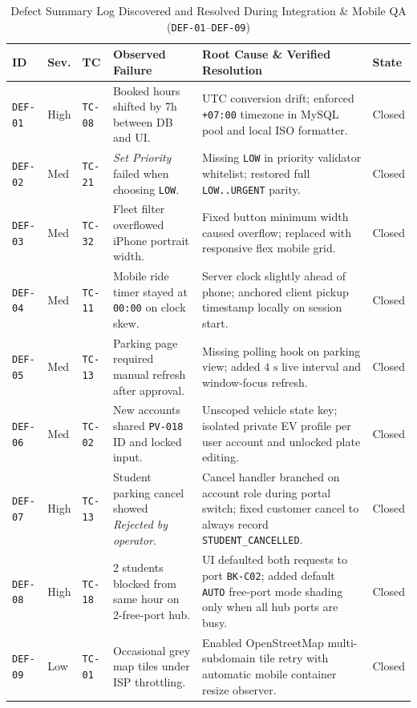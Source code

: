 \begin{table}[H]
  \centering
  \singlespacing\scriptsize
  \caption{Defect Summary Log Discovered and Resolved During Integration \& Mobile QA (\texttt{DEF-01}--\texttt{DEF-09})}
  \label{tab:defects}
  \renewcommand{\arraystretch}{1.20}
  \begin{tabularx}{\textwidth}{|C{1.40cm}|C{1.05cm}|C{1.25cm}|L{3.95cm}|Y|C{1.10cm}|}
    \hline
    \textbf{ID} & \textbf{Sev.} & \textbf{TC} & \textbf{Observed Failure} & \textbf{Root Cause \& Verified Resolution} & \textbf{State} \\
    \hline
    \texttt{DEF-01} & High & \texttt{TC-08} & Booked hours shifted by 7h between DB and UI. & UTC conversion drift; enforced \texttt{+07:00} timezone in MySQL pool and local ISO formatter. & Closed \\
    \hline
    \texttt{DEF-02} & Med & \texttt{TC-21} & \textit{Set Priority} failed when choosing \texttt{LOW}. & Missing \texttt{LOW} in priority validator whitelist; restored full \texttt{LOW..URGENT} parity. & Closed \\
    \hline
    \texttt{DEF-03} & Med & \texttt{TC-32} & Fleet filter overflowed iPhone portrait width. & Fixed button minimum width caused overflow; replaced with responsive flex mobile grid. & Closed \\
    \hline
    \texttt{DEF-04} & Med & \texttt{TC-11} & Mobile ride timer stayed at \texttt{00:00} on clock skew. & Server clock slightly ahead of phone; anchored client pickup timestamp locally on session start. & Closed \\
    \hline
    \texttt{DEF-05} & Med & \texttt{TC-13} & Parking page required manual refresh after approval. & Missing polling hook on parking view; added $4\text{ s}$ live interval and window-focus refresh. & Closed \\
    \hline
    \texttt{DEF-06} & Med & \texttt{TC-02} & New accounts shared \texttt{PV-018} ID and locked input. & Unscoped vehicle state key; isolated private EV profile per user account and unlocked plate editing. & Closed \\
    \hline
    \texttt{DEF-07} & High & \texttt{TC-13} & Student parking cancel showed \textit{Rejected by operator}. & Cancel handler branched on account role during portal switch; fixed customer cancel to always record \texttt{STUDENT\_\allowbreak CANCELLED}. & Closed \\
    \hline
    \texttt{DEF-08} & High & \texttt{TC-18} & 2 students blocked from same hour on 2-free-port hub. & UI defaulted both requests to port \texttt{BK-C02}; added default \texttt{AUTO} free-port mode shading only when all hub ports are busy. & Closed \\
    \hline
    \texttt{DEF-09} & Low & \texttt{TC-01} & Occasional grey map tiles under ISP throttling. & Enabled OpenStreetMap multi-subdomain tile retry with automatic mobile container resize observer. & Closed \\
    \hline
  \end{tabularx}
\end{table}

